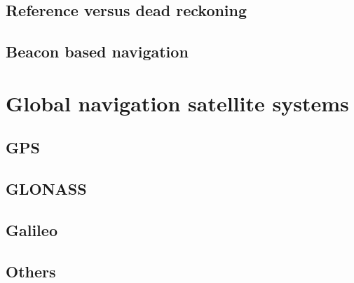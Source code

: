 \subsection{Reference versus dead reckoning}

\subsection{Beacon based navigation}


\section{Global navigation satellite systems}

\subsection{GPS}

\subsection{GLONASS}

\subsection{Galileo}

\subsection{Others}





